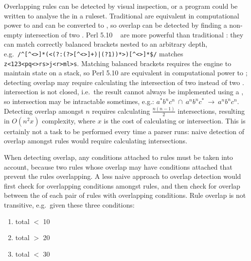 Overlapping rules can be detected by visual inspection, or a program could
be written to analyse the \regexes{} in a ruleset.  Traditional \regexes{}
are equivalent in computational power to  and can be converted
to , so  overlap can be detected by finding a
non-empty intersection of two \@.  Perl 5.10
\regexes{}~\cite{perlre} are more powerful than traditional \regexes{}:
they can match correctly balanced brackets nested to an arbitrary depth,
e.g.\ \verb!/^[^<>]*(<(?:(?>[^<>]+)|(?1))*>)[^<>]*$/!  matches
\verb!z<123<pq<>rs>j<r>ml>s!.  Matching balanced brackets requires the
 engine to maintain state on a stack, so Perl 5.10
\regexes{} are equivalent in computational power to ;
detecting overlap may require calculating the intersection of two
 instead of two .   intersection is
not closed, i.e.\ the result cannot always be implemented using a
, so intersection may be intractable sometimes, e.g.:
$a^{*}b^{n}c^{n}~\cap~a^{n}b^{n}c^{*}~\rightarrow~a^{n}b^{n}c^{n}$.
Detecting overlap amongst $n$ \regexes{} requires calculating
$\frac{n\left(n-1\right)}{2}$ intersections, resulting in
$O\left(n^{2}x\right)$ complexity, where $x$ is the cost of calculating
 or  intersection.  This is certainly not a task
to be performed every time a parser runs: naive detection of overlap
amongst \parsernames{} \numberOFrules{} rules would require calculating
\numberOFruleINTERSECTIONS{} intersections.

When detecting overlap, any conditions attached to rules must be taken into
account, because two rules whose \regexes{} overlap may have conditions
attached that prevent the rules overlapping.  A less naive approach to
overlap detection would first check for overlapping conditions amongst
rules, and then check for overlap between the \regexes{} of each pair of
rules with overlapping conditions.  Rule overlap is not transitive, e.g.\
given these three conditions:

\begin{enumerate}

    \squeezeitems{}

    \item total $<$ 10

    \item total $>$ 20

    \item total $<$ 30

\end{enumerate}

